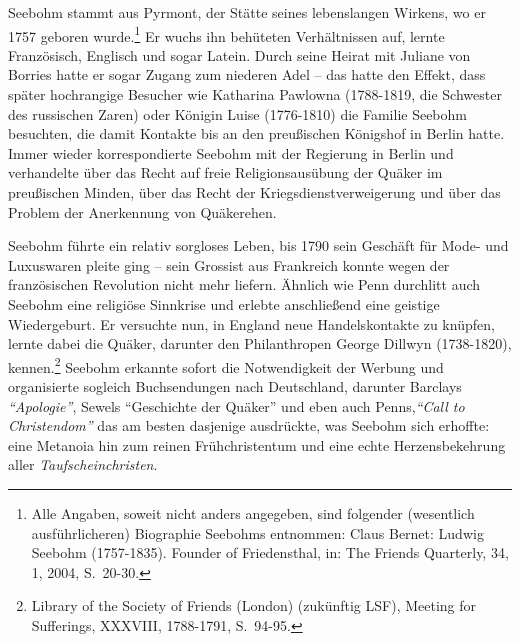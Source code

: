 \medskip

Seebohm stammt aus Pyrmont, der Stätte seines lebenslangen
Wirkens, wo er 1757 geboren wurde.\footnote{Alle Angaben, soweit nicht anders
angegeben, sind folgender (wesentlich
ausführlicheren) Biographie Seebohms entnommen: Claus Bernet: Ludwig Seebohm
(1757-1835). Founder of Friedensthal, in: The Friends Quarterly, 34, 1, 2004,
S.~20-30.} Er wuchs ihn behüteten Verhältnissen auf, lernte Französisch,
Englisch und sogar Latein. Durch seine Heirat mit Juliane von
Borries hatte er sogar Zugang zum niederen
Adel -- das hatte den Effekt, dass später
hochrangige Besucher wie Katharina Pawlowna
(1788-1819, die Schwester des russischen Zaren) oder Königin
Luise (1776-1810) die Familie Seebohm besuchten,
die damit Kontakte bis an den preußischen Königshof in Berlin hatte. Immer wieder korrespondierte
Seebohm mit der Regierung in Berlin und verhandelte über das Recht auf freie
Religionsausübung der Quäker im preußischen Minden, über das
Recht der Kriegsdienstverweigerung und
über das Problem der Anerkennung von Quäkerehen.

\medskip

Seebohm führte ein relativ sorgloses Leben, bis 1790 sein Geschäft für Mode- und
Luxuswaren pleite ging -- sein Grossist aus
Frankreich konnte wegen der französischen
Revolution nicht mehr liefern. Ähnlich wie Penn
durchlitt auch Seebohm eine religiöse Sinnkrise und erlebte
anschließend eine geistige Wiedergeburt. Er
versuchte nun, in England neue
Handelskontakte zu knüpfen, lernte dabei die Quäker,
darunter den Philanthropen George Dillwyn
(1738-1820), kennen.\footnote{Library of the Society of Friends (London)
(zukünftig LSF), Meeting for
Sufferings, XXXVIII, 1788-1791, S.~94-95.} Seebohm erkannte sofort die
Notwendigkeit der Werbung und organisierte sogleich Buchsendungen
nach Deutschland, darunter Barclays
\textit{"`Apologie"'}, Sewels "`Geschichte der Quäker"' und eben auch Penns,\textit{"`Call to
Christendom"'} das am besten dasjenige ausdrückte, was Seebohm sich erhoffte:
eine Metanoia hin zum reinen
Frühchristentum und eine echte
Herzensbekehrung aller
\textit{Taufscheinchristen}.

